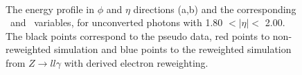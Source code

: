 \begin{figure}[htbp]
    \centering
	 \\
	\begin{tcolorbox}[colback=black!5!white,colframe=white!75!black]
    \caption{The energy profile in $\phi$ and $\eta$ directions (a,b) and the corresponding \Rphi \ and \Reta \ variables, for unconverted photons with 1.80 $ < |\eta| < $ 2.00. The black points correspond to the pseudo data, red points to non-reweighted simulation and blue points to the reweighted simulation from $Z\rightarrow ll\gamma$ with derived electron reweighting.}
    \label{Electron:2}
    \end{tcolorbox}
    
\end{figure}

